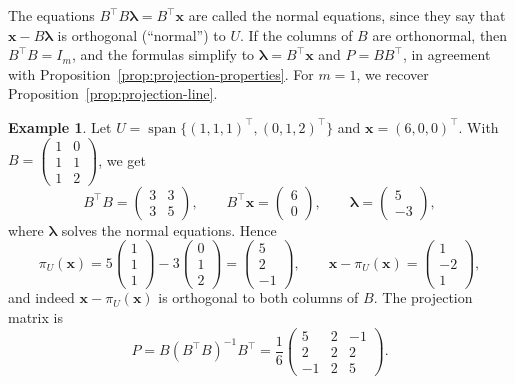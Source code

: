 \documentclass[11pt]{article}
\theoremstyle{definition}
\newtheorem{example}[definition]{Example}
\theoremstyle{plain}
\theoremstyle{remark}
\DeclareMathOperator{\Span}{span}
\begin{document}
The equations $B^\top B \boldsymbol{\lambda} = B^\top \mathbf{x}$ are called the normal equations, since they say that $\mathbf{x} - B\boldsymbol{\lambda}$ is orthogonal (``normal'') to $U$. If the columns of $B$ are orthonormal, then $B^\top B = I_m$, and the formulas simplify to $\boldsymbol{\lambda} = B^\top \mathbf{x}$ and $P = BB^\top$, in agreement with Proposition~\ref{prop:projection-properties}. For $m = 1$, we recover Proposition~\ref{prop:projection-line}.

\begin{example}\label{ex:projection-plane}
    Let $U = \Span\{(1, 1, 1)^\top, (0, 1, 2)^\top\}$ and $\mathbf{x} = (6, 0, 0)^\top$. With $B = \begin{pmatrix} 1 & 0 \\ 1 & 1 \\ 1 & 2 \end{pmatrix}$, we get
    \[B^\top B = \begin{pmatrix} 3 & 3 \\ 3 & 5 \end{pmatrix}, \qquad B^\top \mathbf{x} = \begin{pmatrix} 6 \\ 0 \end{pmatrix}, \qquad \boldsymbol{\lambda} = \begin{pmatrix} 5 \\ -3 \end{pmatrix},\]
    where $\boldsymbol{\lambda}$ solves the normal equations. Hence
    \[\pi_U(\mathbf{x}) = 5 \begin{pmatrix} 1 \\ 1 \\ 1 \end{pmatrix} - 3 \begin{pmatrix} 0 \\ 1 \\ 2 \end{pmatrix} = \begin{pmatrix} 5 \\ 2 \\ -1 \end{pmatrix}, \qquad \mathbf{x} - \pi_U(\mathbf{x}) = \begin{pmatrix} 1 \\ -2 \\ 1 \end{pmatrix},\]
    and indeed $\mathbf{x} - \pi_U(\mathbf{x})$ is orthogonal to both columns of $B$. The projection matrix is
    \[P = B (B^\top B)^{-1} B^\top = \frac{1}{6} \begin{pmatrix} 5 & 2 & -1 \\ 2 & 2 & 2 \\ -1 & 2 & 5 \end{pmatrix}.\]
\end{example}
\end{document}
